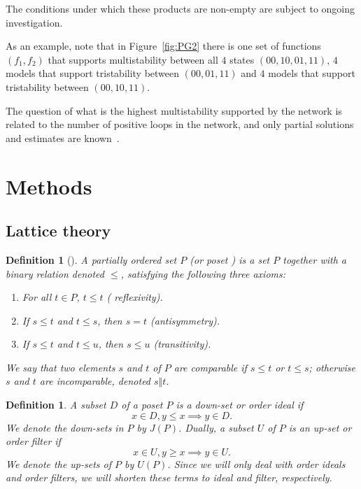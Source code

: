 \documentclass[10pt,letterpaper]{article}
\newtheorem{defn}[thm]{Definition}
\begin{document}
The conditions under which these products are non-empty are subject to ongoing investigation. 

As an example, note that in Figure~\ref{fig:PG2} there is one set of functions $(f_1, f_2)$ that supports multistability between all $4$ states $(00, 10, 01, 11)$, $4$ models that support tristability between $(00, 01, 11)$ and $4$ models that support tristability between $(00, 10, 11)$. 

The question of what is the highest multistability supported by the network is related to the number of positive loops in the network, and only partial solutions and estimates are known~\cite{aracena_number_2017}.


\section{Methods}
\subsection{Lattice theory} \label{lattice_math}

\begin{defn}[\cite{stanley_enumerative_2011}]
A partially ordered set $P$ (or \textit{ poset }) is a set $P$ together with a binary relation denoted $\leq$, satisfying the following three axioms:
\begin{enumerate}
    \item For all $t \in P$, $t\leq t$ (\textit{ reflexivity}).
    \item If $s \leq t$ and $t\leq s$, then $s=t$ (\textit{antisymmetry}).
    \item If $s \leq t$ and $t\leq u$, then $s \leq u$ (\textit{transitivity}).
\end{enumerate}
We say that two elements $s$ and $t$ of $P$ are comparable if $s \leq t$ or $t \leq s$; otherwise $s$ and $t$ are incomparable, denoted $s \Vert t$.
\end{defn}



\begin{defn}
 A subset $D$ of a poset $P$ is a \textit{ down-set} or \textit{ order ideal } if 
\[ x\in D, y \leq x \implies y \in D.\]
We denote the down-sets in $P$ by $J(P)$. Dually, a subset $U$ of $P$ is an \textit{ up-set} or \textit{ order filter } if
\[ x\in U, y \geq x \implies y \in U.\]
We denote the up-sets of $P$ by $U(P)$.
Since we will only deal with order ideals and order filters, we will shorten these terms to \textit{ ideal } and \textit{ filter,} respectively.
\end{defn}
\end{document}
